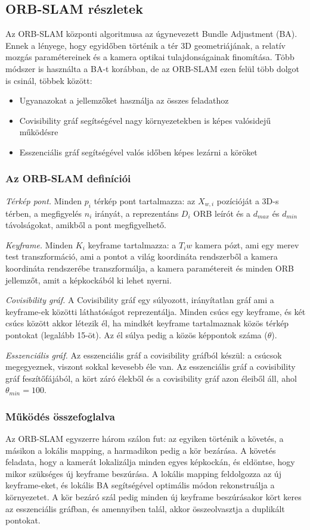 \subsection{ORB-SLAM részletek}

Az ORB-SLAM központi algoritmusa az úgynevezett Bundle Adjustment (BA). 
Ennek a lényege, hogy egyidőben történik a tér 3D geometriájának, a relatív mozgás paramétereinek és a kamera optikai tulajdonságainak finomítása.
Több módszer is használta a BA-t korábban, de az ORB-SLAM ezen felül több dolgot is csinál, többek között: 
\begin{itemize}
	\item Ugyanazokat a jellemzőket használja az összes feladathoz
	\item Covisibility gráf segítségével nagy környezetekben is képes valósidejű működésre
	\item Esszenciális gráf segítségével valós időben képes lezárni a köröket
\end{itemize}

\subsubsection{Az ORB-SLAM definíciói}

\textit{Térkép pont.} Minden $p_i$ térkép pont tartalmazza: az $X_{w, i}$ pozícióját a 3D-s térben, a megfigyelés $n_i$ irányát, a reprezentáns $D_i$ ORB leírót és a $d_{max}$ és $d_{min}$ távolságokat, amikből a pont megfigyelhető.

\textit{Keyframe.} Minden $K_i$ keyframe tartalmazza: a $T_iw$ kamera pózt, ami egy merev test transzformáció, ami a pontot a világ koordináta rendszerből a kamera koordináta rendszerébe transzformálja, a kamera paramétereit és minden ORB jellemzőt, amit a képkockából ki lehet nyerni. 

\textit{Covisibility gráf.} A Covisibility gráf egy súlyozott, irányítatlan gráf ami a keyframe-ek közötti láthatóságot reprezentálja. 
Minden csúcs egy keyframe, és két csúcs között akkor létezik él, ha mindkét keyframe tartalmaznak közös térkép pontokat (legalább 15-öt). 
Az él súlya pedig a közös képpontok száma ($\theta$).

\textit{Esszenciális gráf.} Az esszenciális gráf a covisibility gráfból készül: a csúcsok megegyeznek, viszont sokkal kevesebb éle van. 
Az esszenciális gráf a covisibility gráf feszítőfájából, a kört záró élekből és a covisibility gráf azon éleiből áll, ahol $\theta_{min} = 100$.

\subsubsection{Működés összefoglalva}
Az ORB-SLAM egyszerre három szálon fut: az egyiken történik a követés, a másikon a lokális mapping, a harmadikon pedig a kör bezárása.
A követés feladata, hogy a kamerát lokalizálja minden egyes képkockán, és eldöntse, hogy mikor szükséges új keyframe beszúrása.
A lokális mapping feldolgozza az új keyframe-eket, és lokális BA segítségével optimális módon rekonstruálja a környezetet.
A kör bezáró szál pedig minden új keyframe beszúrásakor kört keres az esszenciális gráfban, és amennyiben talál, akkor összeolvasztja a duplikált pontokat.

